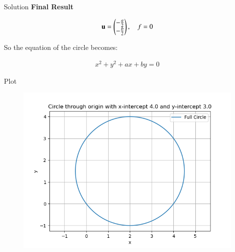 \documentclass{beamer}
\begin{document}
\begin{frame}{Solution}
\textbf{Final Result}

\begin{align}
\mathbf{u} = \begin{pmatrix} -\frac{a}{2} \\ -\frac{b}{2} \end{pmatrix}, \quad f = 0
\end{align}


So the equation of the circle becomes:


\begin{align}
x^2 + y^2 + ax + by = 0
\end{align}

\end{frame}

\begin{frame}{Plot}
    \begin{figure}
        \centering
        \includegraphics[width=0.7\linewidth]{./figs/Figure_1.png}
        \caption{}
        \label{fig:fig1}
    \end{figure}
\end{frame}
\end{document}
